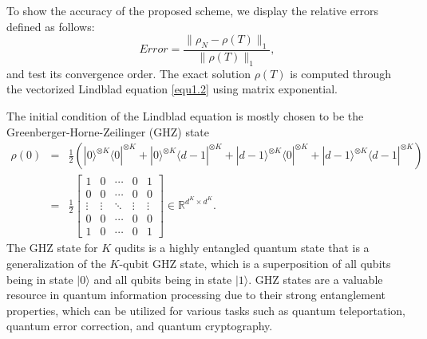 \documentclass[preprint,3p,compress,12pt]{elsarticle}
\numberwithin{equation}{section}
\numberwithin{figure}{section}
\begin{document}
To show the accuracy of the proposed scheme, we display the relative errors defined as follows:
 \[Error=\frac{\|\rho_N-\rho(T)\|_1}{\|\rho(T)\|_1},\]
 and test its convergence order. The exact solution $\rho(T)$ is computed through the vectorized Lindblad equation \eqref{equ1.2} using matrix exponential.

The initial condition of the Lindblad equation is mostly chosen to be the Greenberger-Horne-Zeilinger (GHZ) state
\begin{eqnarray*}
  \rho(0)&=&\frac{1}{2}\left(|0\rangle^{\otimes K}\langle0|^{\otimes K}+
|0\rangle^{\otimes K}\langle d-1|^{\otimes K}+|d-1\rangle^{\otimes K}\langle0|^{\otimes K}+|d-1\rangle^{\otimes K}\langle d-1|^{\otimes K}\right)\\
&=&\frac{1}{2}\begin{bmatrix}
  1&0&\cdots&0&1\\
  0&0&\cdots&0&0\\
  \vdots&\vdots&\ddots&\vdots&\vdots\\
  0&0&\cdots&0&0\\
  1&0&\cdots&0&1
\end{bmatrix}\in \mathbb{R}^{d^K\times d^K}.
\end{eqnarray*}
  The GHZ state for $K$ qudits is a highly entangled quantum state that is a generalization of the $K$-qubit GHZ state, which is a superposition of all qubits being in state $|0\rangle$ and all qubits being in state $|1\rangle$. GHZ states are a valuable resource in quantum information processing due to their strong entanglement properties, which can be utilized for various tasks such as quantum teleportation, quantum error correction, and quantum cryptography.
\end{document}
